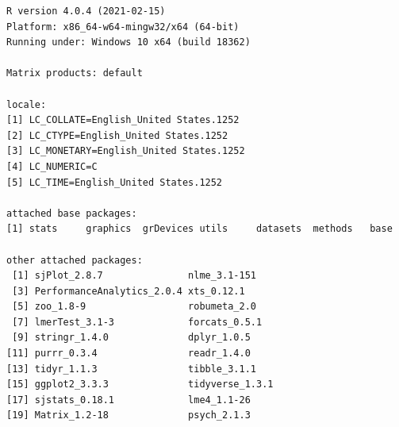 \documentclass[
  english,
]{book}
\begin{document}
\begin{verbatim}
R version 4.0.4 (2021-02-15)
Platform: x86_64-w64-mingw32/x64 (64-bit)
Running under: Windows 10 x64 (build 18362)

Matrix products: default

locale:
[1] LC_COLLATE=English_United States.1252 
[2] LC_CTYPE=English_United States.1252   
[3] LC_MONETARY=English_United States.1252
[4] LC_NUMERIC=C                          
[5] LC_TIME=English_United States.1252    

attached base packages:
[1] stats     graphics  grDevices utils     datasets  methods   base     

other attached packages:
 [1] sjPlot_2.8.7               nlme_3.1-151              
 [3] PerformanceAnalytics_2.0.4 xts_0.12.1                
 [5] zoo_1.8-9                  robumeta_2.0              
 [7] lmerTest_3.1-3             forcats_0.5.1             
 [9] stringr_1.4.0              dplyr_1.0.5               
[11] purrr_0.3.4                readr_1.4.0               
[13] tidyr_1.1.3                tibble_3.1.1              
[15] ggplot2_3.3.3              tidyverse_1.3.1           
[17] sjstats_0.18.1             lme4_1.1-26               
[19] Matrix_1.2-18              psych_2.1.3               


\end{verbatim}
\end{document}
